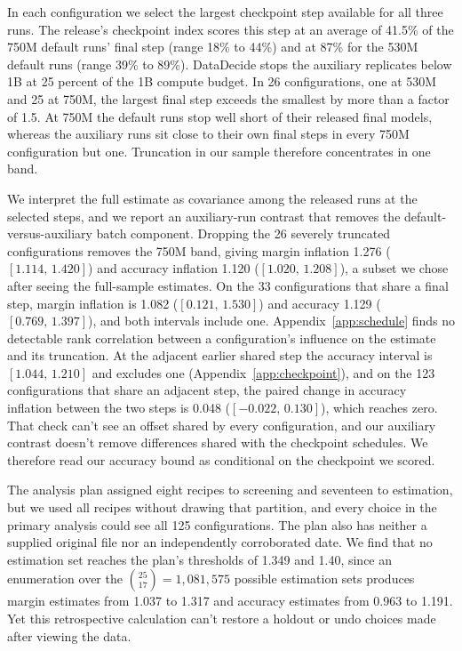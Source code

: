 \documentclass{article}
\newcommand{\ci}[2]{\ensuremath{[#1,\,#2]}}
\begin{document}
In each configuration we select the largest checkpoint step available for all three runs. The release's checkpoint index scores this step at an average of 41.5\% of the 750M default runs' final step (range 18\% to 44\%) and at 87\% for the 530M default runs (range 39\% to 89\%). DataDecide stops the auxiliary replicates below 1B at 25 percent of the 1B compute budget. In 26 configurations, one at 530M and 25 at 750M, the largest final step exceeds the smallest by more than a factor of 1.5. At 750M the default runs stop well short of their released final models, whereas the auxiliary runs sit close to their own final steps in every 750M configuration but one. Truncation in our sample therefore concentrates in one band.

We interpret the full estimate as covariance among the released runs at the selected steps, and we report an auxiliary-run contrast that removes the default-versus-auxiliary batch component. Dropping the 26 severely truncated configurations removes the 750M band, giving margin inflation 1.276 (\ci{1.114}{1.420}) and accuracy inflation 1.120 (\ci{1.020}{1.208}), a subset we chose after seeing the full-sample estimates. On the 33 configurations that share a final step, margin inflation is 1.082 (\ci{0.121}{1.530}) and accuracy 1.129 (\ci{0.769}{1.397}), and both intervals include one. Appendix~\ref{app:schedule} finds no detectable rank correlation between a configuration's influence on the estimate and its truncation. At the adjacent earlier shared step the accuracy interval is \ci{1.044}{1.210} and excludes one (Appendix~\ref{app:checkpoint}), and on the 123 configurations that share an adjacent step, the paired change in accuracy inflation between the two steps is 0.048 (\ci{-0.022}{0.130}), which reaches zero. That check can't see an offset shared by every configuration, and our auxiliary contrast doesn't remove differences shared with the checkpoint schedules. We therefore read our accuracy bound as conditional on the checkpoint we scored.

The analysis plan assigned eight recipes to screening and seventeen to estimation, but we used all recipes without drawing that partition, and every choice in the primary analysis could see all 125 configurations. The plan also has neither a supplied original file nor an independently corroborated date. We find that no estimation set reaches the plan's thresholds of 1.349 and 1.40, since an enumeration over the $\binom{25}{17}=1{,}081{,}575$ possible estimation sets produces margin estimates from 1.037 to 1.317 and accuracy estimates from 0.963 to 1.191. Yet this retrospective calculation can't restore a holdout or undo choices made after viewing the data.
\end{document}
